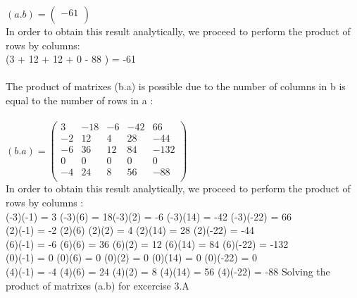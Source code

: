 \documentclass[12pt]{article}
\begin{document}
$(a.b) = \left(
\begin{array}{c}
 -61 \\
\end{array}
\right)$ \\

In order to obtain this result analytically, we proceed to perform the product of rows by columns:
\\
(3 + 12 + 12 + 0 - 88 ) = -61  \\
\\
The product of matrixes (b.a) is possible due to the number of columns in b is equal to the number of rows in a : \\
\\
$(b.a)= \left(
\begin{array}{ccccc}
 3 & -18 & -6 & -42 & 66 \\
 -2 & 12 & 4 & 28 & -44 \\
 -6 & 36 & 12 & 84 & -132 \\
 0 & 0 & 0 & 0 & 0 \\
 -4 & 24 & 8 & 56 & -88 \\
\end{array}
\right)$
\\

In order to obtain this result analytically, we proceed to perform the product of rows by columns : \\

(-3)(-1) = 3 \thinspace(-3)(6) = 18\thinspace (-3)(2) = -6 \thinspace (-3)(14) = -42 \thinspace (-3)(-22) = 66
\\ \vfill
(2)(-1) = -2 \thinspace (2)(6) \thinspace (2)(2) = 4 \thinspace (2)(14) = 28 \thinspace (2)(-22) = -44
\\ \vfill
(6)(-1) = -6 \thinspace (6)(6) = 36 \thinspace (6)(2) = 12 \thinspace (6)(14) = 84 \thinspace (6)(-22) = -132
\\ \vfill
(0)(-1) = 0 \thinspace (0)(6) = 0 \thinspace (0)(2) = 0 \thinspace (0)(14) = 0 \thinspace (0)(-22) = 0
\\ \vfill
(4)(-1) = -4 \thinspace (4)(6) = 24 \thinspace (4)(2) = 8 \thinspace (4)(14) = 56 \thinspace (4)(-22) = -88 \vfill
Solving the product of matrixes (a.b) for excercise 3.A \vfill
\end{document}
